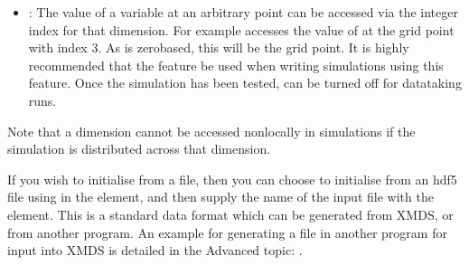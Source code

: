 \documentclass[letterpaper,10pt,english]{sphinxmanual}
\begin{document}
\begin{itemize}
\item {} 
\sphinxAtStartPar
{}: The value of a variable at an arbitrary point can be accessed via the integer index for that dimension. For example  accesses the value of  at the grid point with index 3.  As  is zero\sphinxhyphen{}based, this will be the  grid point.  It is highly recommended that the {\hyperref[\detokenize{reference_elements:diagnostics}]{}} feature be used when writing simulations using this feature.  Once the simulation has been tested,  can be turned off for data\sphinxhyphen{}taking runs.

\end{itemize}

\ignorespaces 
\sphinxAtStartPar
Note that a dimension cannot be accessed non\sphinxhyphen{}locally in  simulations if the simulation is distributed across that dimension.

\ignorespaces {}\label{\detokenize{reference_elements:filenameelement}}
\ignorespaces 
\sphinxAtStartPar
If you wish to initialise from a file, then you can choose to initialise from an hdf5 file using  in the  element, and then supply the name of the input file with the  element.  This is a standard data format which can be generated from XMDS, or from another program.  An example for generating a file in another program for input into XMDS is detailed in the Advanced topic: {\hyperref[\detokenize{advanced_topics:importing}]{}}.
\end{document}
